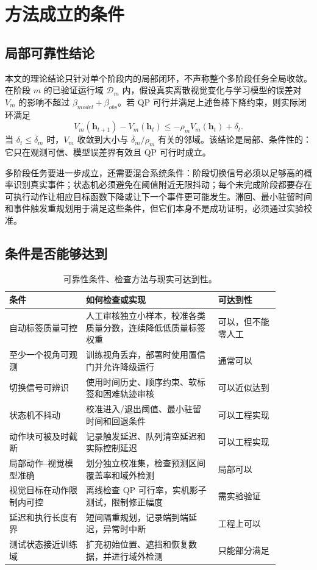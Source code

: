 \documentclass[UTF8,a4paper,11pt]{ctexart}
\begin{document}
\section{方法成立的条件}

\subsection{局部可靠性结论}

本文的理论结论只针对单个阶段内的局部闭环，不声称整个多阶段任务全局收敛。在阶段 $m$ 的已验证运行域 $\mathcal D_m$ 内，假设真实离散视觉变化与学习模型的误差对 $V_m$ 的影响不超过 $\beta_{model}+\beta_{obs}$。若 QP 可行并满足上述鲁棒下降约束，则实际闭环满足
\begin{equation}
V_m(\bm h_{t+1})-V_m(\bm h_t)
\leq-\rho_mV_m(\bm h_t)+\delta_t.
\end{equation}
当 $\delta_t\leq\bar\delta_m$ 时，$V_m$ 收敛到大小与 $\bar\delta_m/\rho_m$ 有关的邻域。该结论是局部、条件性的：它只在观测可信、模型误差界有效且 QP 可行时成立。

多阶段任务要进一步成立，还需要混合系统条件：阶段切换信号必须以足够高的概率识别真实事件；状态机必须避免在阈值附近无限抖动；每个未完成阶段都要存在可执行动作让相应目标函数下降或让下一个事件更可能发生。滞回、最小驻留时间和事件触发重规划用于满足这些条件，但它们本身不是成功证明，必须通过实验校准。

\subsection{条件是否能够达到}

\begin{table}[htbp]
  \centering
  \small
  \begin{tabular}{p{0.25\linewidth}p{0.43\linewidth}p{0.20\linewidth}}
    \toprule
    条件 & 如何检查或实现 & 可达到性 \\
    \midrule
    自动标签质量可控 & 人工审核独立小样本，校准各类质量分数，连续降低低质量标签权重 & 可以，但不能零人工 \\
    至少一个视角可观测 & 训练视角丢弃，部署时使用置信门并允许降级运行 & 通常可以 \\
    切换信号可辨识 & 使用时间历史、顺序约束、软标签和困难轨迹审核 & 可以近似达到 \\
    状态机不抖动 & 校准进入/退出阈值、最小驻留时间和回退条件 & 可以工程实现 \\
    动作块可被及时截断 & 记录触发延迟、队列清空延迟和实际控制延迟 & 可以工程实现 \\
    局部动作--视觉模型准确 & 划分独立校准集，检查预测区间覆盖率和域外检测 & 局部可以 \\
    视觉目标在动作限制内可控 & 离线检查 QP 可行率，实机影子测试，限制修正幅度 & 需实验验证 \\
    延迟和执行长度有界 & 短间隔重规划，记录端到端延迟，异常时中断 & 工程上可以 \\
    测试状态接近训练域 & 扩充初始位置、遮挡和恢复数据，并进行域外检测 & 只能部分满足 \\
    \bottomrule
  \end{tabular}
  \caption{可靠性条件、检查方法与现实可达到性。}
\end{table}
\end{document}
